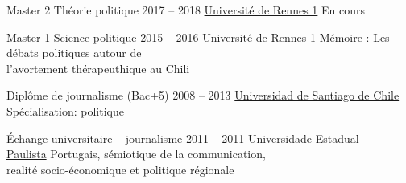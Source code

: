 
\def\tbflanguage{french}

\tbftinytrue




%
%








\begin{coordinatelist}
\end{coordinatelist}









%
%




\begin{yearlist}

\item[Master 2 Théorie politique]{2017 -- 2018}
     {\href{https://formations.univ-rennes1.fr/formations/master-2-theorie-politique}{Université de Rennes 1}}
     {En cours}
     

\item[Master 1 Science politique]{2015 -- 2016}
     {\href{https://formations.univ-rennes1.fr/formations/master-1-science-politique}{Université de Rennes 1}}
     {Mémoire : Les débats politiques autour de \\ l'avortement
     thérapeuthique au Chili}


\item[Diplôme de journalisme (Bac+5)]{2008 -- 2013}
     {\href{http://periodismo.usach.cl/} {Universidad de Santiago de Chile}}
     {Spécialisation: politique}


\item[Échange universitaire -- journalisme]{2011 -- 2011}
     {\href{http://www.unesp.br/} {Universidade Estadual \\ Paulista}}
     {Portugais, sémiotique de la communication,\\ 
     realité socio-économique et politique régionale}


\end{yearlist}





